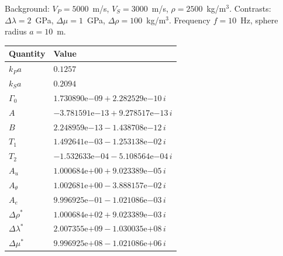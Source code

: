 Background: $V_P = 5000$~m/s, $V_S = 3000$~m/s,
$\rho = 2500$~kg/m$^3$.  Contrasts: $\Delta\lambda = 2$~GPa,
$\Delta\mu = 1$~GPa, $\Delta\rho = 100$~kg/m$^3$.
Frequency $f = 10$~Hz, sphere radius $a = 10$~m.

\medskip
\begin{center}
\begin{tabular}{ll}
\toprule
\textbf{Quantity} & \textbf{Value} \\
\midrule
$k_P a$ & $0.1257$ \\
$k_S a$ & $0.2094$ \\
\midrule
$\Gamma_0$ & $1.730890\mathrm{e}{-09} + 2.282529\mathrm{e}{-10}\,i$ \\
$A$        & $-3.781591\mathrm{e}{-13} + 9.278517\mathrm{e}{-13}\,i$ \\
$B$        & $2.248959\mathrm{e}{-13} - 1.438708\mathrm{e}{-12}\,i$ \\
$T_1$      & $1.492641\mathrm{e}{-03} - 1.253138\mathrm{e}{-02}\,i$ \\
$T_2$      & $-1.532633\mathrm{e}{-04} - 5.108564\mathrm{e}{-04}\,i$ \\
$A_u$      & $1.000684\mathrm{e}{+00} + 9.023389\mathrm{e}{-05}\,i$ \\
$A_\theta$ & $1.002681\mathrm{e}{+00} - 3.888157\mathrm{e}{-02}\,i$ \\
$A_e$      & $9.996925\mathrm{e}{-01} - 1.021086\mathrm{e}{-03}\,i$ \\
$\Delta\rho^*$     & $1.000684\mathrm{e}{+02} + 9.023389\mathrm{e}{-03}\,i$ \\
$\Delta\lambda^*$  & $2.007355\mathrm{e}{+09} - 1.030035\mathrm{e}{+08}\,i$ \\
$\Delta\mu^*$      & $9.996925\mathrm{e}{+08} - 1.021086\mathrm{e}{+06}\,i$ \\
\bottomrule
\end{tabular}
\end{center}
